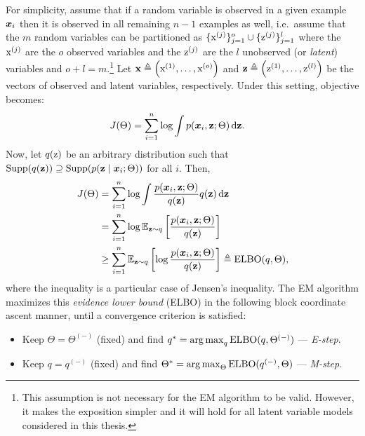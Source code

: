 For simplicity, assume that if a random variable is observed in a given example ${\bm{x}}_i$ then it is observed in all remaining $n-1$ examples as well, i.e.\ assume that the $m$ random variables can be partitioned as $\lbrace {\textnormal{x}}^{(j)} \rbrace_{j=1}^o \cup \lbrace {\textnormal{z}}^{(j)} \rbrace_{j=1}^l$ where the ${\textnormal{x}}^{(j)}$ are the $o$ observed variables and the ${\textnormal{z}}^{(j)}$ are the $l$ unobserved (or \emph{latent}) variables and $o+l=m$.\footnote{This assumption is not necessary for the EM algorithm to be valid. However, it makes the exposition simpler and it will hold for all latent variable models considered in this thesis.} Let ${\mathbf{x}} \triangleq \left({\textnormal{x}}^{(1)}, \dots, {\textnormal{x}}^{(o)} \right)$ and ${\mathbf{z}} \triangleq \left({\textnormal{z}}^{(1)}, \dots, {\textnormal{z}}^{(l)} \right)$ be the vectors of observed and latent variables, respectively. Under this setting, objective  becomes:
\begin{align}
    \label{eq:maximum_marginal_likelihood}
    J(\Theta) &= \sum_{i=1}^n \log \int p({\bm{x}}_i, {\mathbf{z}}; \Theta) {\,\text{d}} {\mathbf{z}}.
\end{align}
Now, let $q({\textnormal{z}})$ be an arbitrary distribution such that $\mathrm{Supp}(q({\mathbf{z}})) \supseteq \mathrm{Supp}(p({\mathbf{z}} \mid {\bm{x}}_i; \Theta))$ for all $i$. Then,
\begingroup
\allowdisplaybreaks
\begin{align}
    J(\Theta) &= \sum_{i=1}^n \log \int \frac{p({\bm{x}}_i, {\mathbf{z}}; \Theta)}{q({\mathbf{z}})} q({\mathbf{z}}) {\,\text{d}} {\mathbf{z}} \nonumber\\
    &= \sum_{i=1}^n \log \mathbb{E}_{{\mathbf{z}} \sim q} \left[ \frac{p({\bm{x}}_i, {\mathbf{z}}; \Theta)} {q({\mathbf{z}})} \right] \nonumber\\
    &\geq \sum_{i=1}^n \mathbb{E}_{{\mathbf{z}} \sim q} \left[ \log  \frac{p({\bm{x}}_i, {\mathbf{z}}; \Theta)}{q({\mathbf{z}})} \right] \triangleq \mathrm{ELBO}(q,\Theta),
\end{align}
\endgroup
where the inequality is a particular case of Jensen's inequality. The EM algorithm maximizes this \emph{evidence lower bound} (ELBO) in the following block coordinate ascent manner, until a convergence criterion is satisfied:
\begin{itemize}
    \item Keep $\Theta = \Theta^{(-)}$ (fixed) and find $q^* = \operatorname*{arg\,max}_q \mathrm{ELBO}(q, \Theta^{(-)})$ --- \emph{E-step}.
    \item Keep $q = q^{(-)}$ (fixed) and find $\Theta^* = \operatorname*{arg\,max}_\Theta \mathrm{ELBO}(q^{(-)}, \Theta)$ --- \emph{M-step}.
\end{itemize}

